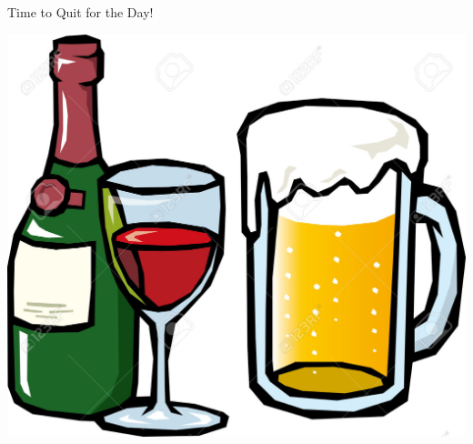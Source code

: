 \documentclass[notes=hide,12pt,xcolor=dvipsnames%
   ]{beamer}
\theoremstyle{definition}
\begin{document}
\begin{frame}[label=pau]{}
\begin{center}

Time to Quit for the Day!

\bigskip\bigskip
\includegraphics[scale=.4]{drinks}
\end{center}
\end{frame}

\end{document}
